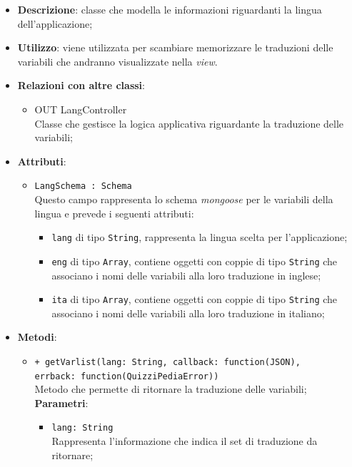 	\begin{itemize}
		\item \textbf{Descrizione}: classe che modella le informazioni riguardanti la lingua dell'applicazione;
		\item \textbf{Utilizzo}: viene utilizzata per scambiare memorizzare le traduzioni delle variabili che andranno visualizzate nella \textit{view}.
		\item \textbf{Relazioni con altre classi}:
			\begin{itemize}
				\item OUT LangController \\
				Classe che gestisce la logica applicativa riguardante la traduzione delle variabili;
			\end{itemize}
		\item \textbf{Attributi}:
			\begin{itemize}
				\item \texttt{LangSchema : Schema} \\
				Questo campo rappresenta lo schema \textit{mongoose} per le variabili della lingua e prevede i seguenti attributi:
					\begin{itemize}
						\item \texttt{lang} di tipo \texttt{String}, rappresenta la lingua scelta per l'applicazione;
						\item \texttt{eng} di tipo \texttt{Array}, contiene oggetti con coppie di tipo \texttt{String} che associano i nomi delle variabili alla loro traduzione in inglese;
						\item \texttt{ita} di tipo \texttt{Array}, contiene oggetti con coppie di tipo \texttt{String} che associano i nomi delle variabili alla loro traduzione in italiano;
					\end{itemize}
			\end{itemize}
		\item \textbf{Metodi}:
			\begin{itemize}
				\item \texttt{+ getVarlist(lang: String, callback: function(JSON), \\ errback: function(QuizziPediaError))} \\
				Metodo che permette di ritornare la traduzione delle variabili; \\
				\textbf{Parametri}:
					\begin{itemize}
						\item \texttt{lang: String} \\
						Rappresenta l'informazione che indica il set di traduzione da ritornare;

\end{itemize}
\end{itemize}
\end{itemize}
